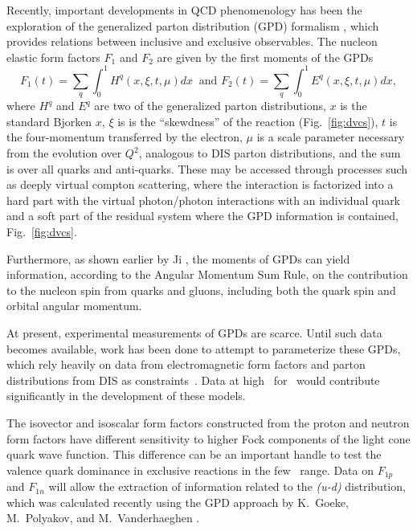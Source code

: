 Recently, important developments in QCD phenomenology has been the exploration of the generalized parton distribution (GPD)
formalism \cite{Ji97,rad96,rad97}, which provides relations between inclusive and exclusive observables.
The nucleon elastic form factors $F_1$ and $F_2$ are given by the first moments of the GPDs
%
\begin{equation}
F_1(t) = \sum_q \int^1_0 H^q (x,\xi,t,\mu) dx\ 
 \mbox{  and\  }
F_2(t) = \sum_q \int^1_0 E^q (x,\xi,t,\mu) dx,
\label{eq:F1/2}
\end{equation}
%
where $H^q$ and $E^q$ are two of the generalized parton distributions, $x$ is the standard Bjorken $x$, $\xi$ is is the ``skewdness'' of the reaction (Fig.~\ref{fig:dvcs}), $t$ is the four-momentum transferred by the electron, $\mu$ is a scale parameter necessary from the evolution over $Q^2$, analogous to DIS parton distributions, and the sum is over all quarks and anti-quarks.  
These may be accessed through processes such as deeply virtual compton scattering, where the interaction is factorized into a hard part with the virtual photon/photon interactions with an individual quark and a soft part of the residual system where the GPD information is contained, Fig.~\ref{fig:dvcs}.%

Furthermore, as shown earlier by Ji \cite{Ji97}, the moments of GPDs can yield information, according to the Angular Momentum Sum Rule, 
on the contribution to the nucleon spin from quarks and gluons, including both the quark spin and orbital angular momentum.

At present, experimental measurements of GPDs are scarce.  
Until such data becomes available, work has been done to attempt to parameterize these GPDs,  which rely heavily on data from electromagnetic form factors and parton distributions from DIS as constraints~\cite{dfjk04, kroll06, guidal08}.  
Data at high \qsq~for \gen~would contribute significantly in the development of these models.

The isovector and isoscalar form factors constructed from the proton and neutron form factors have different sensitivity to higher Fock components of the light cone quark wave function.
This difference can be an important handle to test the valence quark dominance in exclusive reactions in the few \gevcsq~range.
%
Data on $F_{1p}$ and $F_{1n}$ will allow the extraction of information related to the {\it (u-d)} distribution, which was
calculated recently using the GPD approach by K.~Goeke, M.~Polyakov, and M.~Vanderhaeghen \cite{polyakov}.

